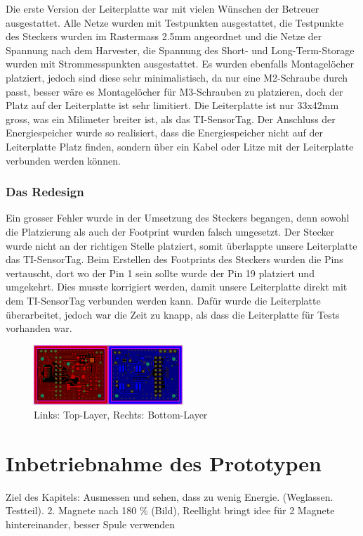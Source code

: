 Die erste Version der Leiterplatte war mit vielen Wünschen der Betreuer ausgestattet. Alle Netze wurden mit Testpunkten ausgestattet, die Testpunkte des Steckers wurden im Rastermass 2.5mm angeordnet und die Netze der Spannung nach dem Harvester, die Spannung des Short- und Long-Term-Storage wurden mit Strommesspunkten ausgestattet. Es wurden ebenfalls Montagelöcher platziert, jedoch sind diese sehr minimalistisch, da nur eine M2-Schraube durch passt, besser wäre es Montagelöcher für M3-Schrauben zu platzieren, doch der Platz auf der Leiterplatte ist sehr limitiert. Die Leiterplatte ist nur 33x42mm gross, was ein Milimeter breiter ist, als das TI-SensorTag. Der Anschluss der Energiespeicher wurde so realisiert, dass die Energiespeicher nicht auf der Leiterplatte Platz finden, sondern über ein Kabel oder Litze mit der Leiterplatte verbunden werden können.

\subsubsection{Das Redesign}

Ein grosser Fehler wurde in der Umsetzung des Steckers begangen, denn sowohl die Platzierung als auch der Footprint wurden falsch umgesetzt. Der Stecker wurde nicht an der richtigen Stelle platziert, somit überlappte unsere Leiterplatte das TI-SensorTag. Beim Erstellen des Footprints des Steckers wurden die Pins vertauscht, dort wo der Pin 1 sein sollte wurde der Pin 19 platziert und umgekehrt. Dies musste korrigiert werden, damit unsere Leiterplatte direkt mit dem TI-SensorTag verbunden werden kann. Dafür wurde die Leiterplatte überarbeitet, jedoch war die Zeit zu knapp, als dass die Leiterplatte für Tests vorhanden war.

\begin{figure}[ht]
    \includegraphics[width=0.5\textwidth]{3Vorgehen/imag/Layout_Redesign.png}
    \caption{Links: Top-Layer, Rechts: Bottom-Layer}\label{layout_redesign} 
\end{figure}


\section{Inbetriebnahme des Prototypen}
Ziel des Kapitels: Ausmessen und sehen, dass zu wenig Energie. (Weglassen. Testteil). 2. Magnete nach 180 \% (Bild), Reellight bringt idee für 2 Magnete hintereinander, besser Spule verwenden

